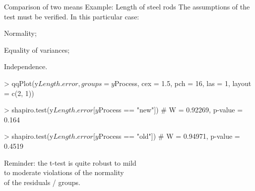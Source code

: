 \documentclass[t]{beamer}
\begin{document}

\begin{ftstf}
{Comparison of two means}
{Example: Length of steel rods}
The assumptions of the test must be verified. In this particular case:

\bitems \alert{Normality};
\item Equality of variances;
\item Independence.
\eitem
\begin{rcode}
> qqPlot(y$Length.error, groups = y$Process, 
        cex = 1.5, pch = 16,  las = 1,
        layout = c(2, 1))

> shapiro.test(y$Length.error[y$Process == "new"])
# W = 0.92269, p-value = 0.164

> shapiro.test(y$Length.error[y$Process == "old"])
# W = 0.94971, p-value = 0.4519
\end{rcode}
\vhalf Reminder: the t-test is quite robust to mild\\
to moderate violations of the normality\\
of the residuals / groups.

\end{ftstf}

\end{document}

